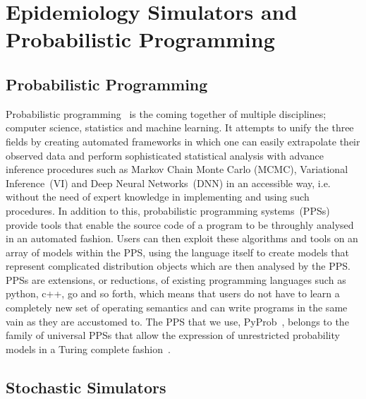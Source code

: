 \documentclass{article}
\begin{document}
\section{Epidemiology Simulators and Probabilistic Programming}
\label{sec:background}



\subsection{Probabilistic Programming}
Probabilistic programming~\cite{gordon2014probabilistic,staton2016semantics,kozen1979semantics} is the coming together of multiple disciplines; computer science, statistics and machine learning. 
It attempts to unify the three fields by creating automated frameworks in which one can easily extrapolate their observed data and perform sophisticated statistical analysis with advance inference procedures such as 
Markov Chain Monte Carlo (MCMC), Variational Inference~(VI) and Deep Neural Networks~(DNN) in an accessible way, i.e. without the need of expert knowledge in implementing and using such procedures. In addition to this, probabilistic programming systems~(PPSs) provide tools that enable the source code of a program to be throughly analysed in an automated fashion.
Users can then exploit these algorithms and tools on an array of models
within the PPS, using the language itself to create models that represent complicated distribution objects which are then analysed by the PPS. 
PPSs are extensions, or reductions, of existing programming languages such as python, c++, go and so forth, which means that users do not have to learn
a completely new set of operating semantics and can write programs in the same vain as they are accustomed to.  
The PPS that we use, PyProb~\cite{le-2016-inference,baydin2018efficient}, belongs to the family of universal PPSs 
that allow the expression of unrestricted probability models in a Turing complete fashion~\cite{wood2014new,goodman2012church,landau_binder_2014,siddharth2017learning,bingham2019pyro}.

\subsection{Stochastic Simulators}
\end{document}
